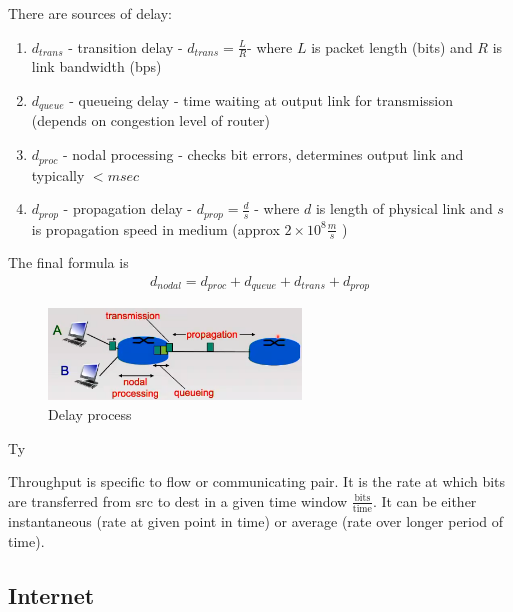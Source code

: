 \documentclass[a4paper]{article}
\theoremstyle{plain}
\newtheorem{thm}{Theorem}[section]
\theoremstyle{definition}
\newtheorem{defn}{Definition}[section]
\theoremstyle{remark}
\begin{document}
\begin{tcolorbox}[colback=black!3!white,colframe=black!60!white,title=\begin{thm}Four sources of delay \label{Four sourceso f delay}\end{thm}]
	There are sources of delay:
	\begin{enumerate}
		\item $d_{trans}$ - transition delay - $d_{trans} = \frac{L}{R}$- where $L$ is packet length (bits) and $R$ is link bandwidth (bps)
		\item $d_{queue}$ - queueing delay - time waiting at output link for transmission (depends on congestion level of router)
		\item $d_{proc}$ - nodal processing - checks bit errors, determines output link and typically $<msec$
		\item $d_{prop}$ - propagation delay - $d_{prop} = \frac{d}{s}$ - where $d$ is length of physical link and $s$ is propagation speed in medium (approx $2\times 10^{8}\frac{m}{s}$ )
	\end{enumerate}
	The final formula is
		\begin{align}
		d_{nodal} = d_{proc}+d_{queue}+d_{trans}+d_{prop}
		\end{align}
		\begin{figure}[H]
			\centering
			\includegraphics[width=0.6\textwidth]{twenty.png}
			\caption{Delay process}
			\label{fig:}
		\end{figure}
\end{tcolorbox}
Ty\begin{tcolorbox}[colback=black!3!white,colframe=black!60!white,title=\begin{defn}Throughput \label{Throughput}\end{defn}]
Throughput is specific to flow or communicating pair. It is the rate at which bits are transferred from src to dest in a given time window $\frac{\text{bits}}{\text{time}}$. It can be either instantaneous (rate at given point in time) or average (rate over longer period of time). 
\end{tcolorbox}
\subsection{Internet}
\end{document}
